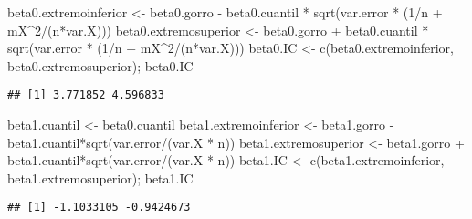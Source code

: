 \documentclass[
]{article}
\newenvironment{Shaded}{\begin{snugshade}}{\end{snugshade}}
\newcommand{\DecValTok}[1]{\textcolor[rgb]{0.00,0.00,0.81}{#1}}
\newcommand{\FunctionTok}[1]{\textcolor[rgb]{0.00,0.00,0.00}{#1}}
\newcommand{\NormalTok}[1]{#1}
\newcommand{\OtherTok}[1]{\textcolor[rgb]{0.56,0.35,0.01}{#1}}
\newcommand{\SpecialCharTok}[1]{\textcolor[rgb]{0.00,0.00,0.00}{#1}}
\begin{document}
\begin{Shaded}
\begin{Highlighting}[]
\NormalTok{beta0.extremoinferior }\OtherTok{\textless{}{-}}\NormalTok{ beta0.gorro }\SpecialCharTok{{-}}\NormalTok{ beta0.cuantil }\SpecialCharTok{*} \FunctionTok{sqrt}\NormalTok{(var.error }\SpecialCharTok{*}\NormalTok{ (}\DecValTok{1}\SpecialCharTok{/}\NormalTok{n }\SpecialCharTok{+}\NormalTok{ mX}\SpecialCharTok{\^{}}\DecValTok{2}\SpecialCharTok{/}\NormalTok{(n}\SpecialCharTok{*}\NormalTok{var.X)))}
\NormalTok{beta0.extremosuperior }\OtherTok{\textless{}{-}}\NormalTok{ beta0.gorro }\SpecialCharTok{+}\NormalTok{ beta0.cuantil }\SpecialCharTok{*} \FunctionTok{sqrt}\NormalTok{(var.error }\SpecialCharTok{*}\NormalTok{ (}\DecValTok{1}\SpecialCharTok{/}\NormalTok{n }\SpecialCharTok{+}\NormalTok{ mX}\SpecialCharTok{\^{}}\DecValTok{2}\SpecialCharTok{/}\NormalTok{(n}\SpecialCharTok{*}\NormalTok{var.X)))}
\NormalTok{beta0.IC }\OtherTok{\textless{}{-}} \FunctionTok{c}\NormalTok{(beta0.extremoinferior, beta0.extremosuperior); beta0.IC}
\end{Highlighting}
\end{Shaded}

\begin{verbatim}
## [1] 3.771852 4.596833
\end{verbatim}

\begin{Shaded}
\begin{Highlighting}[]
\NormalTok{beta1.cuantil }\OtherTok{\textless{}{-}}\NormalTok{ beta0.cuantil}
\NormalTok{beta1.extremoinferior }\OtherTok{\textless{}{-}}\NormalTok{ beta1.gorro }\SpecialCharTok{{-}}\NormalTok{ beta1.cuantil}\SpecialCharTok{*}\FunctionTok{sqrt}\NormalTok{(var.error}\SpecialCharTok{/}\NormalTok{(var.X }\SpecialCharTok{*}\NormalTok{ n))}
\NormalTok{beta1.extremosuperior }\OtherTok{\textless{}{-}}\NormalTok{ beta1.gorro }\SpecialCharTok{+}\NormalTok{ beta1.cuantil}\SpecialCharTok{*}\FunctionTok{sqrt}\NormalTok{(var.error}\SpecialCharTok{/}\NormalTok{(var.X }\SpecialCharTok{*}\NormalTok{ n))}
\NormalTok{beta1.IC }\OtherTok{\textless{}{-}} \FunctionTok{c}\NormalTok{(beta1.extremoinferior, beta1.extremosuperior); beta1.IC}
\end{Highlighting}
\end{Shaded}

\begin{verbatim}
## [1] -1.1033105 -0.9424673
\end{verbatim}
\end{document}
